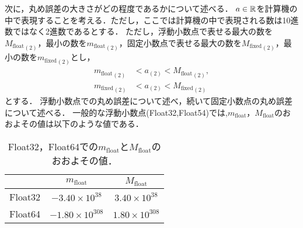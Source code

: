 次に，丸め誤差の大きさがどの程度であるかについて述べる．
$a \in \mathbb{R}$を計算機の中で表現することを考える．ただし，ここでは計算機の中で表現される数は10進数ではなく2進数であるとする．
ただし，浮動小数点で表せる最大の数を${M_{\mathrm{float}}}_{(2)}$，最小の数を${m_{\mathrm{float}}}_{(2)}$，固定小数点で表せる最大の数を${M_{\mathrm{fixed}}}_{(2)}$，最小の数を${m_{\mathrm{fixed}}}_{(2)}$とし，
\begin{align*}
   {m_{\mathrm{float}}}_{(2)} &< a_{(2)} < {M_{\mathrm{float}}}_{(2)}, \\
   {m_{\mathrm{fixed}}}_{(2)} &< a_{(2)} < {M_{\mathrm{fixed}}}_{(2)}
\end{align*}
とする．
浮動小数点での丸め誤差について述べ，続いて固定小数点の丸め誤差について述べる．
一般的な浮動小数点(Float32,Float54)では,$m_{\mathrm{float}}$，$M_{\mathrm{float}}$のおおよその値は以下のような値である．
\begin{table}[H]
    \centering
    \caption{Float32，Float64での$m_{\mathrm{float}}$と$M_{\mathrm{float}}$のおおよその値．}
    \begin{tabular}{c|c|c}
         & $m_{\mathrm{float}}$ & $M_{\mathrm{float}}$ \\ \hline \hline
         Float32 & $-3.40 \times 10^{38}$ & $3.40 \times 10^{38}$ \\ \hline
         Float64 & $-1.80 \times 10^{308}$ & $1.80 \times 10^{308}$
    \end{tabular}
\end{table}

